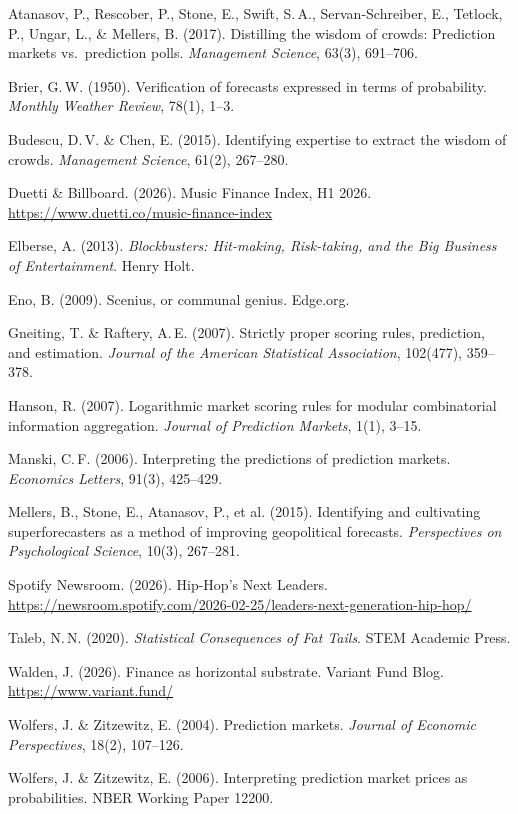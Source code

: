 \documentclass[9pt,oneside]{amsart}
\begin{document}
\small

\begin{enumerate}[label={[\arabic*]}, nosep, leftmargin=1.5em]
  \item Atanasov, P., Rescober, P., Stone, E., Swift, S.\,A., Servan-Schreiber, E., Tetlock, P., Ungar, L., \& Mellers, B. (2017). Distilling the wisdom of crowds: Prediction markets vs.\ prediction polls. \emph{Management Science}, 63(3), 691--706.
  \item Brier, G.\,W. (1950). Verification of forecasts expressed in terms of probability. \emph{Monthly Weather Review}, 78(1), 1--3.
  \item Budescu, D.\,V. \& Chen, E. (2015). Identifying expertise to extract the wisdom of crowds. \emph{Management Science}, 61(2), 267--280.
  \item Duetti \& Billboard. (2026). Music Finance Index, H1 2026. \url{https://www.duetti.co/music-finance-index}
  \item Elberse, A. (2013). \emph{Blockbusters: Hit-making, Risk-taking, and the Big Business of Entertainment}. Henry Holt.
  \item Eno, B. (2009). Scenius, or communal genius. Edge.org.
  \item Gneiting, T. \& Raftery, A.\,E. (2007). Strictly proper scoring rules, prediction, and estimation. \emph{Journal of the American Statistical Association}, 102(477), 359--378.
  \item Hanson, R. (2007). Logarithmic market scoring rules for modular combinatorial information aggregation. \emph{Journal of Prediction Markets}, 1(1), 3--15.
  \item Manski, C.\,F. (2006). Interpreting the predictions of prediction markets. \emph{Economics Letters}, 91(3), 425--429.
  \item Mellers, B., Stone, E., Atanasov, P., et al. (2015). Identifying and cultivating superforecasters as a method of improving geopolitical forecasts. \emph{Perspectives on Psychological Science}, 10(3), 267--281.
  \item Spotify Newsroom. (2026). Hip-Hop's Next Leaders. \url{https://newsroom.spotify.com/2026-02-25/leaders-next-generation-hip-hop/}
  \item Taleb, N.\,N. (2020). \emph{Statistical Consequences of Fat Tails}. STEM Academic Press.
  \item Walden, J. (2026). Finance as horizontal substrate. Variant Fund Blog. \url{https://www.variant.fund/}
  \item Wolfers, J. \& Zitzewitz, E. (2004). Prediction markets. \emph{Journal of Economic Perspectives}, 18(2), 107--126.
  \item Wolfers, J. \& Zitzewitz, E. (2006). Interpreting prediction market prices as probabilities. NBER Working Paper 12200.
\end{enumerate}
\end{document}
